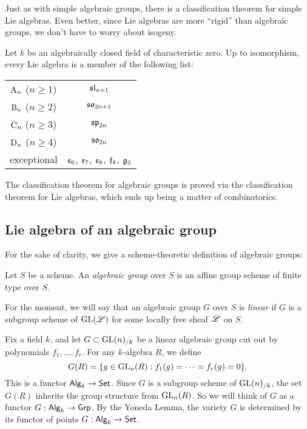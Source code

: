 Just as with simple algebraic groups, there is a classification theorem for 
simple Lie algebras. Even better, since Lie algebras are more ``rigid'' than 
algebraic groups, we don't have to worry about isogeny. 

\begin{theorem}
Let $k$ be an algebraically closed field of characteristic zero. Up to 
isomorphism, every Lie algebra is a member of the following list: 
\begin{center}
\begin{tabular}{c|c}
$\mathrm{A}_n$ ($n\geqslant 1$) & $\mathfrak{sl}_{n+1}$ \\
$\mathrm{B}_n$ ($n\geqslant 2$) & $\mathfrak{so}_{2n+1}$ \\
$\mathrm{C}_n$ ($n\geqslant 3$) & $\mathfrak{sp}_{2n}$ \\
$\mathrm{D}_n$ ($n\geqslant 4$)  & $\mathfrak{so}_{2n}$ \\
exceptional & $\mathfrak{e}_6$, $\mathfrak{e}_7$, $\mathfrak{e}_8$, $\mathfrak{f}_4$, $\mathfrak{g}_2$
\end{tabular}
\end{center}
\end{theorem}

The classification theorem for algebraic groups is proved via the 
classification theorem for Lie algebras, which ends up being a matter of 
combinatorics. 





\subsection{Lie algebra of an algebraic group}

For the sake of clarity, we give a scheme-theoretic definition of algebraic 
groups:

\begin{definition}
Let $S$ be a scheme. An \emph{algebraic group} over $S$ is an affine group 
scheme of finite type over $S$. 
\end{definition}

For the moment, we will say that an algebraic group $G$ over $S$ is 
\emph{linear} if $G$ is a subgroup scheme of $\operatorname{GL}(\mathscr{L})$ for some locally 
free sheaf $\mathscr{L}$ on $S$. 

Fix a field $k$, and let $G\subset \operatorname{GL}(n)_{/k}$ be a linear algebraic group cut 
out by polynomials $f_1,\dots,f_r$. For any $k$-algebra $R$, we define
\[
  G(R) = \{g\in \operatorname{GL}_n(R):f_1(g)=\cdots = f_r(g)=0\} .
\]
This is a functor $\mathsf{Alg}_{k}\to \mathsf{Set}$. Since $G$ is a subgroup scheme of 
$\operatorname{GL}(n)_{/k}$, the set $G(R)$ inherits the group structure from $\operatorname{GL}_n(R)$. 
So we will think of $G$ as a functor $G:\mathsf{Alg}_{k} \to \mathsf{Grp}$. By the Yoneda 
Lemma, the variety $G$ is determined by its functor of points 
$G:\mathsf{Alg}_{k}\to \mathsf{Set}$. 

